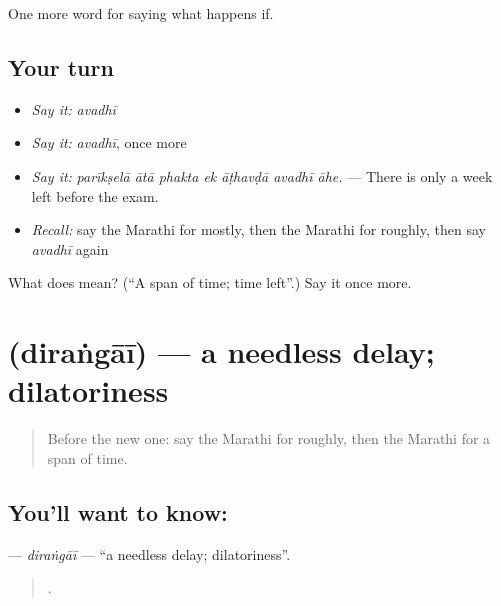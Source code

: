 \begin{grammarlens}[title={What you've built}]
One more word for saying what happens if.
\end{grammarlens}

\subsection*{Your turn}
\begin{itemize}
\raggedright
  \item \emph{Say it:} \emph{avadhī}
  \item \emph{Say it:} \emph{avadhī}, once more
  \item \emph{Say it:} \emph{parīkṣelā ātā phakta ek āṭhavḍā avadhī āhe.} — There is only a week left before the exam.
  \item \emph{Recall:} say the Marathi for mostly, then the Marathi for roughly, then say \emph{avadhī} again
\end{itemize}

\begin{tcolorbox}[breakable,colback=teal!4,colframe=teal!35!black,title={Before you move on}]
What does  mean? (\textquotedblleft{}A span of time; time left\textquotedblright{}.) Say it once more.
\end{tcolorbox}
\section[\texorpdfstring{\mr{दिरंगाई} (diraṅgāī)}{दिरंगाई (diraṅgāī)}]{ (diraṅgāī) — a needless delay; dilatoriness}

\label{lesson:MR-C555-dirangai}



\begin{quote}
Before the new one: say the Marathi for roughly, then the Marathi for a span of time.
\end{quote}

\subsection*{You'll want to know: }
\textbf{} — \emph{diraṅgāī} — \textquotedblleft{}a needless delay; dilatoriness\textquotedblright{}.

\begin{quote}
      .
\end{quote}

